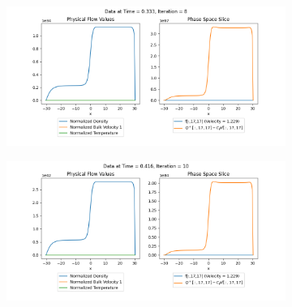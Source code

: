 \documentclass{article}
\begin{document}
\begin{figure}[H]
    \begin{subfigure}[b]{\textwidth}
    \includegraphics[width=\textwidth]{imgs/lf_output2/plots/plot8.png}
    \end{subfigure}
    \hfill
    \begin{subfigure}[b]{\textwidth}
    \includegraphics[width=\textwidth]{imgs/lf_output2/plots/plot10.png}
    \end{subfigure}
\end{figure}
\end{document}
